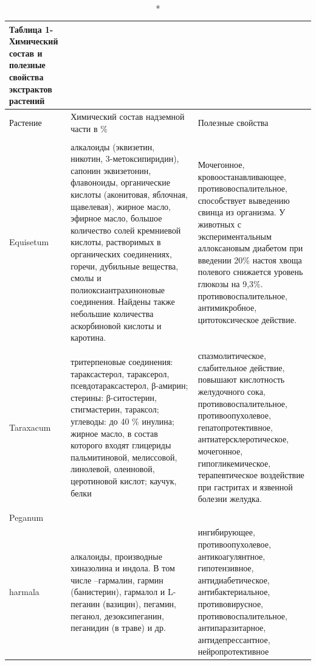 \begin{longtable}[c]{|p{}|p{}|p{}|}
\caption*{Таблица 1- Химический состав и полезные свойства экстрактов
растений} \\
\hline
Растение &
  Химический состав надземной части в \% &
  Полезные свойства \\ \hline
\endfirsthead
%
\endhead
%
\begin{tabular}[c]{@{}l@{}}Хвощ\\   Equisetum\end{tabular} &
  алкалоиды (эквизетин, никотин, 3-метоксипиридин), сапонин эквизетонин, флавоноиды, органические кислоты (аконитовая, яблочная, щавелевая), жирное масло, эфирное масло, большое количество солей кремниевой кислоты, растворимых в органических соединениях, горечи, дубильные вещества, смолы и полиоксиантрахиноновые соединения. Найдены также небольшие количества аскорбиновой кислоты и каротина. &
  Мочегонное, кровоостанавливающее, противовоспалительное, способствует выведению свинца из организма. У животных с экспериментальным аллоксановым диабетом при введении 20\% настоя хвоща полевого снижается уровень глюкозы на 9,3\%. противовоспалительное, антимикробное, цитотоксическое действие. \\ \hline
\begin{tabular}[c]{@{}l@{}}Одуванчик\\   Taraxacum\end{tabular} &
  тритерпеновые соединения: тараксастерол, тараксерол, псевдотараксастерол, β-амирин; стерины: β-ситостерин, стигмастерин, тараксол; углеводы: до 40 \% инулина; жирное масло, в состав которого входят глицериды пальмитиновой, мелиссовой, линолевой, олеиновой, церотиновой кислот; каучук, белки &
  спазмолитическое, слабительное действие, повышают кислотность желудочного сока, противовоспалительное, противоопухолевое, гепатопротективное, антиатерсклеротическое, мочегонное, гипогликемическое, терапевтическое воздействие при гастритах и язвенной болезни желудка. \\ \hline
\begin{tabular}[c]{@{}l@{}}Гармала\\   Peganum\\ harmala\end{tabular} &
  алкалоиды, производные хиназолина и индола. В том числе –гармалин, гармин (банистерин), гармалол и L-пеганин (вазицин), пегамин, пеганол, дезоксипеганин, пеганидин (в траве) и др. &
  ингибирующее, противоопухолевое, антикоагулянтное, гипотензивное, антидиабетическое, антибактериальное, противовирусное, противовоспалительное, антипаразитарное, антидепрессантное, нейропротективное \\ \hline

\end{longtable}
